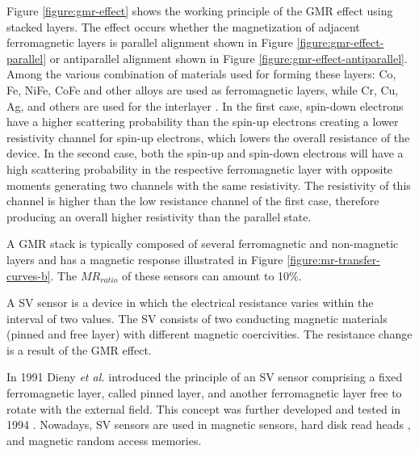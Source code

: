 Figure \ref{figure:gmr-effect} shows the working principle of the \ac{GMR} effect using stacked layers. The effect occurs whether the magnetization of adjacent ferromagnetic layers is parallel alignment shown in Figure \ref{figure:gmr-effect-parallel} or antiparallel alignment shown in Figure \ref{figure:gmr-effect-antiparallel}. Among the various combination of materials used for forming these layers: Co, Fe, NiFe, CoFe and other alloys are used as ferromagnetic layers, while Cr, Cu, Ag, and others are used for the interlayer \cite{4463868}. In the first case, spin-down electrons have a higher scattering probability than the spin-up electrons creating a lower resistivity channel for spin-up electrons, which lowers the overall resistance of the device. In the second case, both the spin-up and spin-down electrons will have a high scattering probability in the respective ferromagnetic layer with opposite moments generating two channels with the same resistivity. The resistivity of this channel is higher than the low resistance channel of the first case, therefore producing an overall higher resistivity than the parallel state.

A \ac{GMR} stack is typically composed of several ferromagnetic and non-magnetic layers and has a magnetic response illustrated in Figure \ref{figure:mr-transfer-curves-b}. The $MR_{ratio}$ of these sensors can amount to 10\%.


\noindent
A \ac{SV} sensor is a device in which the electrical resistance varies within the interval of two values. The \ac{SV} consists of two conducting magnetic materials (pinned and free layer) with different magnetic coercivities. The resistance change is a result of the \ac{GMR} effect.

In 1991 Dieny \textit{et al.} \cite{PhysRevB.43.1297} introduced the principle of an \ac{SV} sensor comprising a fixed ferromagnetic layer, called pinned layer, and another ferromagnetic layer free to rotate with the external field. This concept was further developed and tested in 1994 \cite{312279}. Nowadays, \ac{SV} sensors are used in magnetic sensors, hard disk read heads \cite{IBMResea24:online}, and magnetic random access memories.

